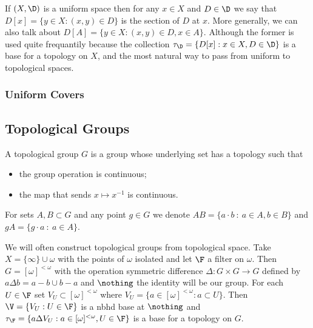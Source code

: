 \documentclass{article}
\begin{document}
    If \((X, \D)\) is a uniform space then for any \(x \in X\) and \(D \in \D\) we say that \(D[x] = \{y \in X:(x, y) \in D\}\) is the section of \(D\) at \(x\). More generally, we can also talk about \(D[A]=\{y \in X:(x, y) \in D, x \in A\}\). Although the former is used quite frequantily because the collection \(\tau_{\D} = \{D[x]:x \in X, D \in \D\}\) is a base for a topology on \(X\), and the most natural way to pass from uniform to topological spaces.
\subsubsection{Uniform Covers}

\subsection{Topological Groups}
\begin{defn}
    A topological group \(G\) is a group whose underlying set has a topology such that 
    \begin{itemize}
        \item the group operation is continuous;
        \item the map that sends \(x \mapsto x^{-1}\) is continuous.
    \end{itemize}
    For sets \(A, B \subset G\) and any point \(g \in G\) we denote \(AB = \{a\cdot b \: : \: a \in A, b \in B\}\) and \(gA = \{g\cdot a \: : \: a \in A\}\).
\end{defn}
 

We will often construct topological groups from topological space. Take \(X = \{\infty\} \cup \omega\) with the points of \(\omega\) isolated and let \(\F\) a filter on \(\omega\). Then \(G = [\omega]^{<\omega}\) with the operation symmetric difference \(\Delta: G \times G \to G\) defined by \(a\Delta b = a- b \cup b- a\) and \(\nothing\) the identity will be our group. For each \(U \in \F\) set \(V_U \subset [\omega]^{<\omega}\) where \(V_U = \{a \in [\omega]^{<\omega}: a \subset U\}\). Then \(\V = \{V_U : U \in \F\}\) is a nbhd base at \(\nothing\) and \(\tau_{\F} = \{a\Delta V_U : a \in [\omega]^{<\omega}, U 
\in \F\}\) is a base for a topology on \(G\).
\end{document}
